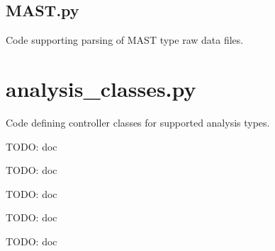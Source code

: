 \documentclass[letterpaper,10pt,english]{sphinxmanual}
\begin{document}
\label{code:module-gfunc.parsers.MAST}

\subsection{MAST.py}
\label{code:mast-py}
Code supporting parsing of MAST type raw data files.
\label{code:module-gfunc.analysis_classes}

\section{analysis\_classes.py}
\label{code:analysis-classes-py}
Code defining controller classes for supported analysis types.

\begin{fulllineitems}
\label{code:gfunc.analysis_classes.BranchLength}
TODO: doc

\begin{fulllineitems}
\label{code:gfunc.analysis_classes.BranchLength.__init__}
TODO: doc

\end{fulllineitems}


\begin{fulllineitems}
\label{code:gfunc.analysis_classes.BranchLength.measure_relation}
TODO: doc

\end{fulllineitems}


\end{fulllineitems}


\begin{fulllineitems}
\label{code:gfunc.analysis_classes.ExpressionSimilarity}
TODO: doc

\begin{fulllineitems}
\label{code:gfunc.analysis_classes.ExpressionSimilarity.__init__}
TODO: doc

\end{fulllineitems}


\end{fulllineitems}
\end{document}
